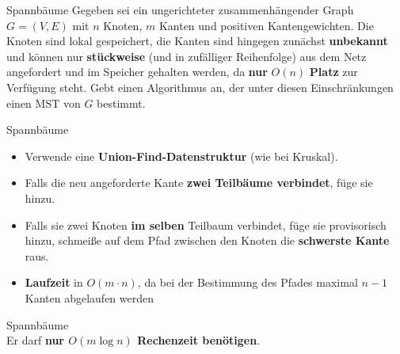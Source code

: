 \begin{frame}{Spannbäume}
	Gegeben sei ein ungerichteter zusammenhängender Graph $G = (V, E)$ mit $n$ Knoten, $m$ Kanten und positiven Kantengewichten. Die Knoten sind lokal gespeichert, die Kanten sind hingegen zunächst \textbf{unbekannt} und können nur \textbf{stückweise} (und in zufälliger Reihenfolge) aus dem Netz angefordert und im Speicher gehalten werden, da \textbf{nur} $O(n)$ \textbf{Platz} zur Verfügung steht. Gebt einen Algorithmus an, der unter diesen Einschränkungen einen MST von $G$ bestimmt.
\end{frame}

\begin{frame}{Spannbäume}
	\solutionheading
	\begin{itemize}
		\item Verwende eine \textbf{Union-Find-Datenstruktur} (wie bei Kruskal). 
		\item Falls die neu angeforderte Kante \textbf{zwei Teilbäume verbindet}, füge sie hinzu. 
		\item Falls sie zwei Knoten \textbf{im selben} Teilbaum verbindet, füge sie provisorisch hinzu, schmeiße auf dem Pfad zwischen den Knoten die \textbf{schwerste Kante} raus. 
		\item \textbf{Laufzeit} in $O(m \cdot n)$, da bei der Bestimmung des Pfades maximal $n-1$ Kanten abgelaufen werden
	\end{itemize}
\end{frame}

\begin{frame}{Spannbäume}
	 \\
	Er darf \textbf{nur $O(m \log n)$ Rechenzeit benötigen}.
\end{frame}

